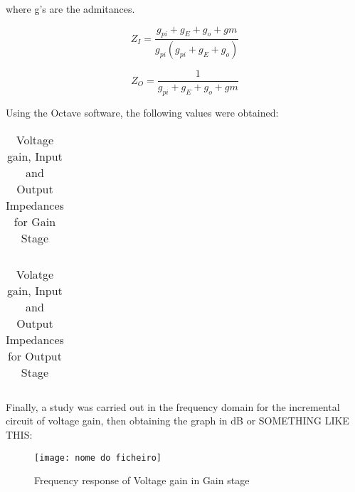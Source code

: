 where g's are the admitances. 

\begin{equation}
  
Z_{I}=\frac{g_{pi}+g_{E}+g_{o}+g{m}}{g_{pi}(g_{pi}+g_{E}+g_{o})}
  \label{}
\end{equation}

\begin{equation}
  
Z_{O}=\frac{1}{g_{pi}+g_{E}+g_{o}+g{m}}
  \label{}
\end{equation}



Using the Octave software, the following values ​​were obtained:

\FloatBarrier
\begin{table}[h]
  \centering
  \begin{tabular}{|c|c|}
    \hline    
    
    \hline
  \end{tabular}
  \caption{Voltage gain, Input and Output Impedances for Gain Stage}
  \label{tab:Octave}
\end{table}
\FloatBarrier    

\FloatBarrier
\begin{table}[h]
  \centering
  \begin{tabular}{|c|c|}
    \hline    
    
    \hline
  \end{tabular}
  \caption{Volatge gain, Input and Output Impedances for Output Stage}
  \label{tab:Octave}
\end{table}
\FloatBarrier     


Finally, a study was carried out in the frequency domain for the incremental circuit of voltage gain, then obtaining the graph in dB or SOMETHING LIKE THIS: 


\begin{figure} [!htb] 
  \texttt{[image: nome do ficheiro]}
  \caption{Frequency response of Voltage gain in Gain stage}
  \label{fig:theoplots}
  \endminipage\hfill
\end{figure}





